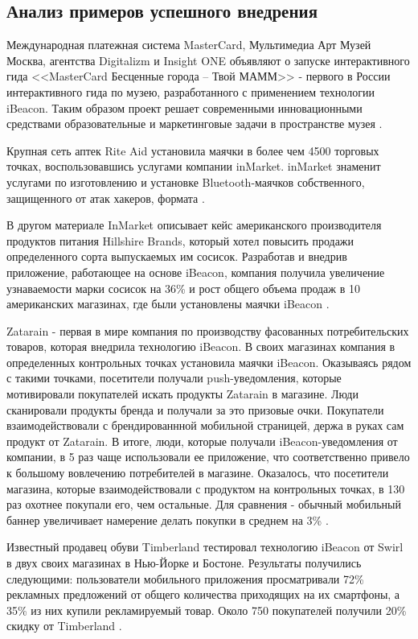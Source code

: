 \subsection{Анализ примеров успешного внедрения}

Международная платежная система MasterCard, Мультимедиа Арт Музей Москва, агентства Digitalizm и Insight ONE объявляют о запуске интерактивного гида <<MasterCard Бесценные города – Твой МАММ>> - первого в России интерактивного гида по музею, разработанного с применением технологии iBeacon. Таким образом проект решает современными инновационными средствами образовательные и маркетинговые задачи в пространстве музея \cite{web:firstMuseum}.

Крупная сеть аптек Rite Aid установила маячки в более чем 4500 торговых точках, воспользовавшись услугами компании inMarket. inMarket знаменит услугами по изготовлению и установке Bluetooth-маячков собственного, защищенного от атак хакеров, формата \cite{web:RiteAid}.

В другом материале InMarket описывает кейс американского производителя продуктов питания Hillshire Brands, который хотел повысить продажи определенного сорта выпускаемых им сосисок. Разработав и внедрив приложение, работающее на основе iBeacon, компания получила увеличение узнаваемости марки сосисок на 36\% и рост общего объема продаж в 10 американских магазинах, где были установлены маячки iBeacon \cite{web:Hillshire}.

Zatarain - первая в мире компания по производству фасованных потребительских товаров, которая внедрила технологию iBeacon. В своих магазинах компания в определенных контрольных точках установила маячки iBeacon. Оказываясь рядом с такими точками, посетители получали push-уведомления, которые мотивировали покупателей искать продукты Zatarain в магазине. Люди сканировали продукты бренда и получали за это призовые очки. Покупатели взаимодействовали с брендированнной мобильной страницей, держа в руках сам продукт от Zatarain. В итоге, люди, которые получали iBeacon-уведомления от компании, в 5 раз чаще использовали ее приложение, что соответственно привело к большому вовлечению потребителей в магазине. Оказалось, что посетители магазина, которые взаимодействовали с продуктом на контрольных точках, в 130 раз охотнее покупали его, чем остальные. Для сравнения -  обычный мобильный баннер увеличивает намерение делать покупки в среднем на 3\% \cite{web:Zatarin}.

Известный продавец обуви Timberland тестировал технологию iBeacon от Swirl в двух своих магазинах в Нью-Йорке и Бостоне. Результаты получились следующими: пользователи мобильного приложения просматривали 72\% рекламных предложений от общего количества приходящих на их смартфоны, а 35\% из них купили рекламируемый товар. Около 750 покупателей получили 20\% скидку от Timberland \cite{web:Timberland}.

